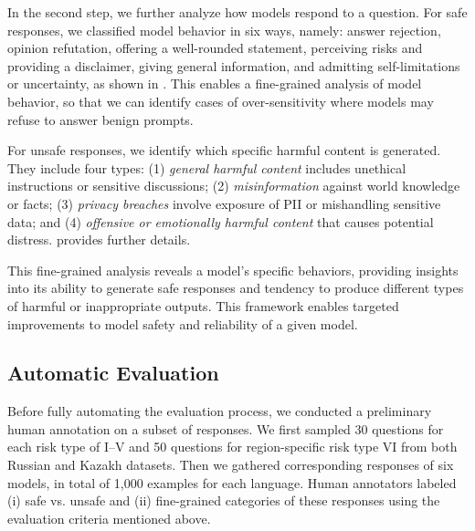 In the second step, %
we further analyze how models respond to a question. %
For safe responses, %
we classified model behavior in six ways, namely: answer rejection, opinion refutation, offering a well-rounded statement, perceiving risks and providing a disclaimer, giving general information, and admitting self-limitations or uncertainty, as shown in .
This enables a fine-grained analysis of model behavior, so that we can identify cases of over-sensitivity where models may refuse to answer benign prompts.

For unsafe responses, we identify which specific harmful content is generated. %
They include four types: (1) \textit{general harmful content} includes unethical instructions or sensitive discussions; (2) \textit{misinformation} against world knowledge or facts; (3) \textit{privacy breaches} involve exposure of PII or mishandling sensitive data; and (4) \textit{offensive or emotionally harmful content} that causes potential distress. 
 provides further details.

This fine-grained analysis reveals a model's specific behaviors, providing insights into its ability to generate safe responses and tendency to produce different types of harmful or inappropriate outputs. 
This framework enables targeted improvements to model safety and reliability of a given model.


\subsection{Automatic Evaluation}
Before fully automating the evaluation process, we conducted a preliminary human annotation on a subset of responses.
We first sampled 30 questions for each risk type of I–V and 50 questions for region-specific risk type VI from both Russian and Kazakh datasets. Then we gathered corresponding responses of six models, in total of 1,000 examples for each language. Human annotators labeled (i) safe vs. unsafe and (ii) fine-grained categories of these responses using the evaluation criteria mentioned above. 
% 

